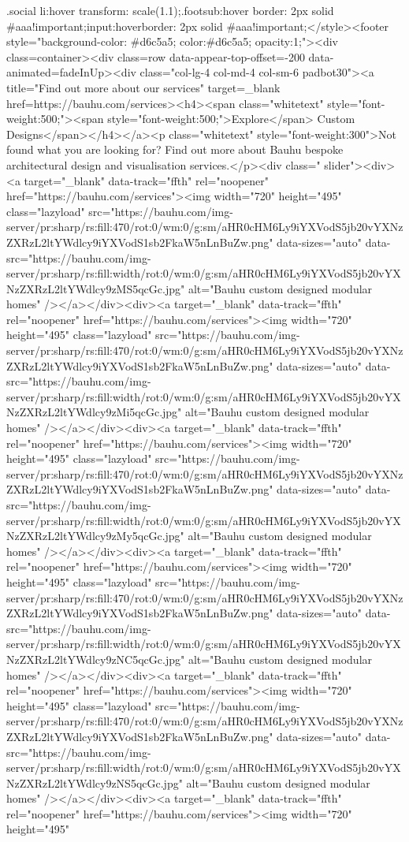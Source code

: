 {{{{{{{.social li:hover {transform: scale(1.1);}.footsub:hover {border: 2px solid #aaa!important;}input:hover{border: 2px solid #aaa!important;}</style><footer style="background-color: #d6c5a5; color:#d6c5a5; opacity:1;"><div class=container><div class=row data-appear-top-offset=-200 data-animated=fadeInUp><div class="col-lg-4 col-md-4 col-sm-6 padbot30"><a title="Find out more about our services" target=_blank href=https://bauhu.com/services><h4><span class="whitetext" style="font-weight:500;"><span style="font-weight:500;">Explore</span> Custom Designs</span></h4></a><p class="whitetext" style="font-weight:300">Not found what you are looking for? Find out more about Bauhu bespoke architectural design and visualisation services.</p><div class=" slider"><div><a target="_blank" data-track="ffth" rel="noopener" href="https://bauhu.com/services"><img width="720" height="495" class="lazyload" src="https://bauhu.com/img-server/pr:sharp/rs:fill:470/rot:0/wm:0/g:sm/aHR0cHM6Ly9iYXVodS5jb20vYXNzZXRzL2ltYWdlcy9iYXVodS1sb2FkaW5nLnBuZw.png" data-sizes="auto" data-src="https://bauhu.com/img-server/pr:sharp/rs:fill:{width}/rot:0/wm:0/g:sm/aHR0cHM6Ly9iYXVodS5jb20vYXNzZXRzL2ltYWdlcy9zMS5qcGc.jpg" alt="Bauhu custom designed modular homes" /></a></div><div><a target="_blank" data-track="ffth" rel="noopener" href="https://bauhu.com/services"><img width="720" height="495" class="lazyload" src="https://bauhu.com/img-server/pr:sharp/rs:fill:470/rot:0/wm:0/g:sm/aHR0cHM6Ly9iYXVodS5jb20vYXNzZXRzL2ltYWdlcy9iYXVodS1sb2FkaW5nLnBuZw.png" data-sizes="auto" data-src="https://bauhu.com/img-server/pr:sharp/rs:fill:{width}/rot:0/wm:0/g:sm/aHR0cHM6Ly9iYXVodS5jb20vYXNzZXRzL2ltYWdlcy9zMi5qcGc.jpg" alt="Bauhu custom designed modular homes" /></a></div><div><a target="_blank" data-track="ffth" rel="noopener" href="https://bauhu.com/services"><img width="720" height="495" class="lazyload" src="https://bauhu.com/img-server/pr:sharp/rs:fill:470/rot:0/wm:0/g:sm/aHR0cHM6Ly9iYXVodS5jb20vYXNzZXRzL2ltYWdlcy9iYXVodS1sb2FkaW5nLnBuZw.png" data-sizes="auto" data-src="https://bauhu.com/img-server/pr:sharp/rs:fill:{width}/rot:0/wm:0/g:sm/aHR0cHM6Ly9iYXVodS5jb20vYXNzZXRzL2ltYWdlcy9zMy5qcGc.jpg" alt="Bauhu custom designed modular homes" /></a></div><div><a target="_blank" data-track="ffth" rel="noopener" href="https://bauhu.com/services"><img width="720" height="495" class="lazyload" src="https://bauhu.com/img-server/pr:sharp/rs:fill:470/rot:0/wm:0/g:sm/aHR0cHM6Ly9iYXVodS5jb20vYXNzZXRzL2ltYWdlcy9iYXVodS1sb2FkaW5nLnBuZw.png" data-sizes="auto" data-src="https://bauhu.com/img-server/pr:sharp/rs:fill:{width}/rot:0/wm:0/g:sm/aHR0cHM6Ly9iYXVodS5jb20vYXNzZXRzL2ltYWdlcy9zNC5qcGc.jpg" alt="Bauhu custom designed modular homes" /></a></div><div><a target="_blank" data-track="ffth" rel="noopener" href="https://bauhu.com/services"><img width="720" height="495" class="lazyload" src="https://bauhu.com/img-server/pr:sharp/rs:fill:470/rot:0/wm:0/g:sm/aHR0cHM6Ly9iYXVodS5jb20vYXNzZXRzL2ltYWdlcy9iYXVodS1sb2FkaW5nLnBuZw.png" data-sizes="auto" data-src="https://bauhu.com/img-server/pr:sharp/rs:fill:{width}/rot:0/wm:0/g:sm/aHR0cHM6Ly9iYXVodS5jb20vYXNzZXRzL2ltYWdlcy9zNS5qcGc.jpg" alt="Bauhu custom designed modular homes" /></a></div><div><a target="_blank" data-track="ffth" rel="noopener" href="https://bauhu.com/services"><img width="720" height="495" }}}}}}}
